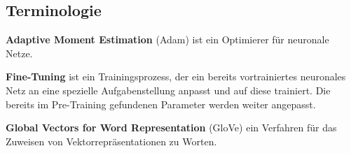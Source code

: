 




\pagebreak
\subsection{Terminologie}

\textbf{Adaptive Moment Estimation} (Adam) ist ein Optimierer für neuronale Netze.

\textbf{Fine-Tuning} ist ein Trainingsprozess, der ein bereits vortrainiertes neuronales Netz an eine spezielle Aufgabenstellung anpasst und auf diese trainiert. Die bereits im Pre-Training gefundenen Parameter werden weiter angepasst.

\textbf{Global Vectors for Word Representation} (GloVe) ein Verfahren für das Zuweisen von Vektorrepräsentationen zu Worten.

